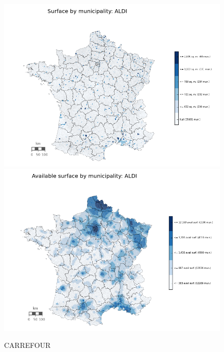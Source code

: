 \documentclass[11pt]{article}
\begin{document}
\begin{figure}[H]
    \caption{CARREFOUR}
	\centering
		\includegraphics[width=15cm]{images/maps_surface/ALDI.png}
        \includegraphics[width=15cm]{images/maps_available_surface/ALDI.png}
\end{figure}
\end{document}
